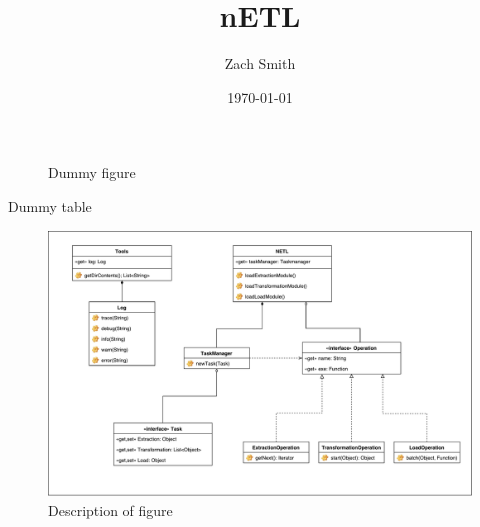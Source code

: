 \documentclass[parskip=full,a4paper]{scrartcl}
\title{nETL}
\author{Zach Smith}
\date{\today}
\begin{document}
\maketitle
\tableofcontents
\newpage

\begin{figure}
    \caption{Dummy figure}
\end{figure}
\begin{table}
    \caption{Dummy table}
\end{table}




\begin{figure}[h]
    \centering
    \includegraphics[scale=0.4]{./resources/figures/netlUML.pdf}
    \caption{Description of figure}
\end{figure}

\newpage

\begin{appendix}
    \listoffigures
    \listoftables
\end{appendix}
\newpage




\end{document}

